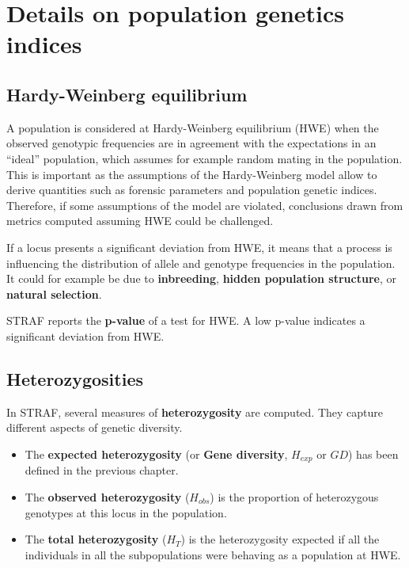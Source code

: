 \documentclass[
]{book}
\begin{document}
\hypertarget{details-on-population-genetics-indices}{%
\section{Details on population genetics indices}\label{details-on-population-genetics-indices}}

\hypertarget{hardy-weinberg-equilibrium}{%
\subsection{Hardy-Weinberg equilibrium}\label{hardy-weinberg-equilibrium}}

A population is considered at Hardy-Weinberg equilibrium (HWE) when the observed
genotypic frequencies are in agreement with the expectations in an ``ideal'' population,
which assumes for example random mating in the population.
This is important as the assumptions of the Hardy-Weinberg model
allow to derive quantities such as forensic parameters and population genetic indices.
Therefore, if some assumptions of the model are violated, conclusions drawn from
metrics computed assuming HWE could be challenged.

If a locus presents a significant deviation from HWE, it means that a process
is influencing the distribution of allele and genotype frequencies in the population.
It could for example be due to \textbf{inbreeding}, \textbf{hidden population structure},
or \textbf{natural selection}.

STRAF reports the \textbf{p-value} of a test for HWE. A low p-value indicates a significant
deviation from HWE.

\hypertarget{heterozygosities}{%
\subsection{Heterozygosities}\label{heterozygosities}}

In STRAF, several measures of \textbf{heterozygosity} are computed. They capture
different aspects of genetic diversity.

\begin{itemize}
\item
  The \textbf{expected heterozygosity} (or \textbf{Gene diversity}, \(H_{exp}\) or \(GD\)) has been defined in the previous chapter.
\item
  The \textbf{observed heterozygosity} (\(H_{obs}\)) is the proportion of heterozygous genotypes at this locus in the population.
\item
  The \textbf{total heterozygosity} (\(H_T\)) is the heterozygosity expected if all the
  individuals in all the subpopulations were behaving as a population at HWE.
\end{itemize}
\end{document}
